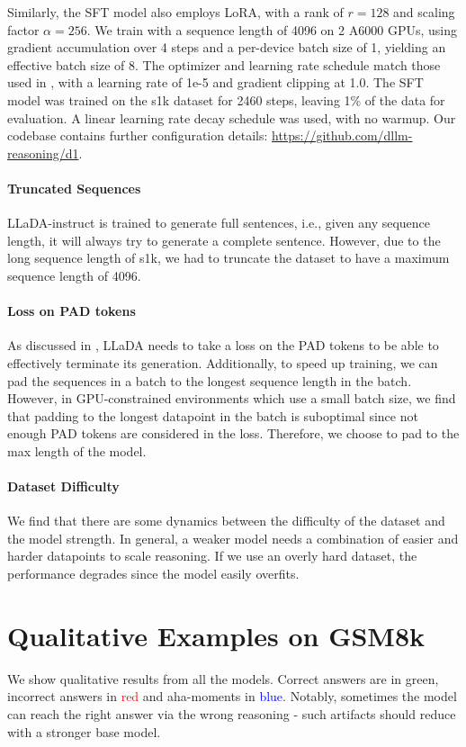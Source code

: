 Similarly, the SFT model also employs LoRA, with a rank of $r = 128$ and scaling factor $\alpha = 256$. We train with a sequence length of 4096 on 2 A6000 GPUs, using gradient accumulation over 4 steps and a per-device batch size of 1, yielding an effective batch size of 8. The optimizer and learning rate schedule match those used in \grpo{}, with a learning rate of 1e-5 and gradient clipping at 1.0. The SFT model was trained on the s1k dataset for 2460 steps, leaving 1\% of the data for evaluation. A linear learning rate decay schedule was used, with no warmup. Our codebase contains further configuration details: \url{https://github.com/dllm-reasoning/d1}.




\paragraph{Truncated Sequences} LLaDA-instruct is trained to generate full sentences, i.e., given any sequence length, it will always try to generate a complete sentence. However, due to the long sequence length of s1k, we had to truncate the dataset to have a maximum sequence length of 4096. 


\paragraph{Loss on PAD tokens} As discussed in \citet{nie2025largelanguagediffusionmodels}, LLaDA needs to take a loss on the PAD tokens to be able to effectively terminate its generation. Additionally, to speed up training, we can pad the sequences in a batch to the longest sequence length in the batch. However, in GPU-constrained environments which use a small batch size, we find that padding to the longest datapoint in the batch is suboptimal since not enough PAD tokens are considered in the loss. Therefore, we choose to pad to the max length of the model.

\paragraph{Dataset Difficulty} We find that there are some dynamics between the difficulty of the dataset and the model strength. In general, a weaker model needs a combination of easier and harder datapoints to scale reasoning. If we use an overly hard dataset, the performance degrades since the model easily overfits.


\section{Qualitative Examples on GSM8k}
\label{appendix:qualitative}
We show qualitative results from all the models. Correct answers are in \textcolor{green!70!black}{green}, incorrect answers in \textcolor{red}{red} and aha-moments in \textcolor{blue}{blue}. Notably, sometimes the model can reach the right answer via the wrong reasoning - such artifacts should reduce with a stronger base model.
